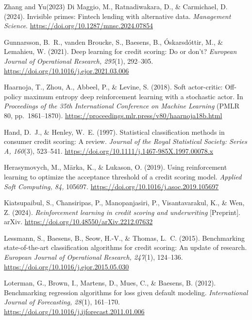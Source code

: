 \documentclass[preprint,review,authoryear,12pt]{elsarticle}
\begin{document}
\begin{thebibliography}{Zhang and Yu(2023)}
    Di Maggio, M., Ratnadiwakara, D., \& Carmichael, D. (2024).
    Invisible primes: Fintech lending with alternative data.
    \textit{Management Science}.
    \url{https://doi.org/10.1287/mnsc.2024.07854} %

    Gunnarsson, B.~R., vanden Broucke, S., Baesens, B., \'Oskarsd\'ottir, M., \& Lemahieu, W. (2021).
    Deep learning for credit scoring: Do or don't?
    \textit{European Journal of Operational Research, 295}(1), 292--305.
    \url{https://doi.org/10.1016/j.ejor.2021.03.006}

    Haarnoja, T., Zhou, A., Abbeel, P., \& Levine, S. (2018).
    Soft actor-critic: Off-policy maximum entropy deep reinforcement learning with a
    stochastic actor. In \textit{Proceedings of the 35th International Conference on Machine
        Learning} (PMLR 80, pp.~1861--1870).
    \url{https://proceedings.mlr.press/v80/haarnoja18b.html}

    Hand, D.~J., \& Henley, W.~E. (1997).
    Statistical classification methods in consumer credit scoring: A review.
    \textit{Journal of the Royal Statistical Society: Series A, 160}(3), 523--541.
    \url{https://doi.org/10.1111/j.1467-985X.1997.00078.x}

    Herasymovych, M., M\"arka, K., \& Lukason, O. (2019).
    Using reinforcement learning to optimize the acceptance threshold of a credit scoring model.
    \textit{Applied Soft Computing, 84,} 105697.
    \url{https://doi.org/10.1016/j.asoc.2019.105697}

    Kiatsupaibul, S., Chansiripas, P., Manopanjasiri, P., Visantavarakul, K., \& Wen, Z. (2024).
    \textit{Reinforcement learning in credit scoring and underwriting} [Preprint]. arXiv.
    \url{https://doi.org/10.48550/arXiv.2212.07632}

    Lessmann, S., Baesens, B., Seow, H.-V., \& Thomas, L.~C. (2015).
    Benchmarking state-of-the-art classification algorithms for credit scoring: An update of research.
    \textit{European Journal of Operational Research, 247}(1), 124--136.
    \url{https://doi.org/10.1016/j.ejor.2015.05.030}

    Loterman, G., Brown, I., Martens, D., Mues, C., \& Baesens, B. (2012).
    Benchmarking regression algorithms for loss given default modeling.
    \textit{International Journal of Forecasting, 28}(1), 161--170.
    \url{https://doi.org/10.1016/j.ijforecast.2011.01.006}


\end{thebibliography}
\end{document}
